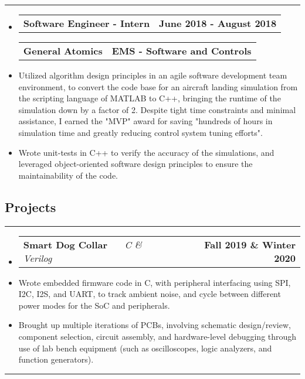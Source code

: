 \documentclass[10pt,letterpaper]{article}
\makeatletter
\newcommand{\header}[2]
{
	\begin{tabular*}{\linewidth}{l @{\extracolsep{\fill}} r}
		\hspace{-27pt} #1 & #2 \\
	\end{tabular*}
}
\newcommand{\sectionbreak}
{
	\vspace{-1.2em}
	\rule{\textwidth}{1.7pt}
	\vspace{-1.7em}
}
\makeatother
\begin{document}
\hrule

\begin{itemize}
	\item[]
		\header
		{\textbf{Software Engineer - Intern}} 
		{\textbf{June 2018 - August 2018}}
		\header
		{\textbf{General Atomics}}
		{\textbf{EMS - Software and Controls}} 
	\item
		Utilized algorithm design principles in an agile software development team environment, to convert the code base for an aircraft landing simulation from the scripting language of MATLAB to C++, bringing the runtime of the simulation down by a factor of 2. Despite tight time constraints and minimal assistance, I earned the "MVP" award for saving "hundreds of hours in simulation time and greatly reducing control system tuning efforts".
	\item
		Wrote unit-tests in C++ to verify the accuracy of the simulations, and leveraged object-oriented software design principles to ensure the maintainability of the code.


\end{itemize}

\vspace{-1.5em}

\subsection*{Projects}
\sectionbreak


\begin{itemize}
	\item[]
		\header
		{
			\textbf{Smart Dog Collar}
			\emph{\smash{Senior Design Project}} \ \ \ \footnotesize \emph{C \& Verilog}
		}
		{\textbf{Fall 2019 \& Winter 2020}}
	\item 
		Wrote embedded firmware code in C, with peripheral interfacing using SPI, I2C, I2S, and UART, to track ambient noise, and cycle between different power modes for the SoC and peripherals.
	\item 
		Brought up multiple iterations of PCBs, involving schematic design/review, component selection, circuit assembly, and hardware-level debugging through use of lab bench equipment (such as oscilloscopes, logic analyzers, and function generators).

\end{itemize}

\hrule
\end{document}
